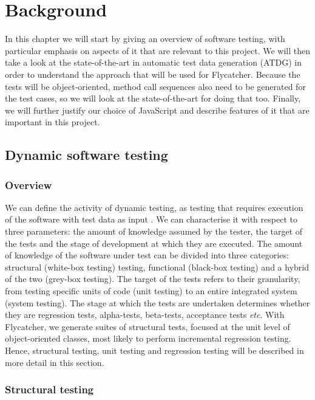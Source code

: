 \chapter{Background}
\label{background}

In this chapter we will start by giving an overview of software testing, with particular emphasis on aspects of it that are relevant to this project. We will then take a look at the state-of-the-art in automatic test data generation (ATDG) in order to understand the approach that will be used for \textsf{Flycatcher}. Because the tests will be object-oriented, method call sequences also need to be generated for the test cases, so we will look at the state-of-the-art for doing that too. Finally, we will further justify our choice of JavaScript and describe features of it that are important in this project.

\section{Dynamic software testing}

\subsection{Overview}

We can define the activity of dynamic testing, as testing that requires execution of the software with test data as input \cite{mahmood2007systematic}. We can characterise it with respect to three parameters: the amount of knowledge assumed by the tester, the target of the tests and the stage of development at which they are executed. The amount of knowledge of the software under test can be divided into three categories: structural (white-box testing) testing, functional (black-box testing) and a hybrid of the two (grey-box testing). The target of the tests refers to their granularity, from testing specific units of code (unit testing) to an entire integrated system (system testing). The stage at which the tests are undertaken determines whether they are regression tests, alpha-tests, beta-tests, acceptance tests \emph{etc}. With \textsf{Flycatcher}, we generate suites of structural tests, focused at the unit level of object-oriented classes, most likely to perform incremental regression testing. Hence, structural testing, unit testing and regression testing will be described in more detail in this section.

\subsection{Structural testing}

